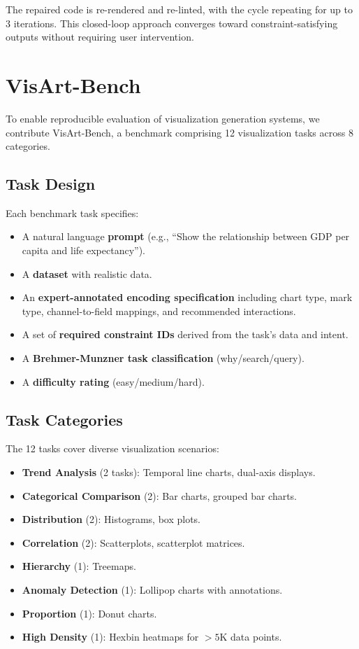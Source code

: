 \documentclass[journal]{vgtc}
\begin{document}
The repaired code is re-rendered and re-linted, with the cycle repeating for up to 3 iterations.
This closed-loop approach converges toward constraint-satisfying outputs without requiring user intervention.

\section{VisArt-Bench}

To enable reproducible evaluation of visualization generation systems, we contribute VisArt-Bench, a benchmark comprising 12 visualization tasks across 8 categories.

\subsection{Task Design}

Each benchmark task specifies:
\begin{itemize}
\item A natural language \textbf{prompt} (e.g., ``Show the relationship between GDP per capita and life expectancy'').
\item A \textbf{dataset} with realistic data.
\item An \textbf{expert-annotated encoding specification} including chart type, mark type, channel-to-field mappings, and recommended interactions.
\item A set of \textbf{required constraint IDs} derived from the task's data and intent.
\item A \textbf{Brehmer-Munzner task classification} (why/search/query).
\item A \textbf{difficulty rating} (easy/medium/hard).
\end{itemize}

\subsection{Task Categories}

The 12 tasks cover diverse visualization scenarios:
\begin{itemize}
\item \textbf{Trend Analysis} (2 tasks): Temporal line charts, dual-axis displays.
\item \textbf{Categorical Comparison} (2): Bar charts, grouped bar charts.
\item \textbf{Distribution} (2): Histograms, box plots.
\item \textbf{Correlation} (2): Scatterplots, scatterplot matrices.
\item \textbf{Hierarchy} (1): Treemaps.
\item \textbf{Anomaly Detection} (1): Lollipop charts with annotations.
\item \textbf{Proportion} (1): Donut charts.
\item \textbf{High Density} (1): Hexbin heatmaps for $>5$K data points.
\end{itemize}
\end{document}
